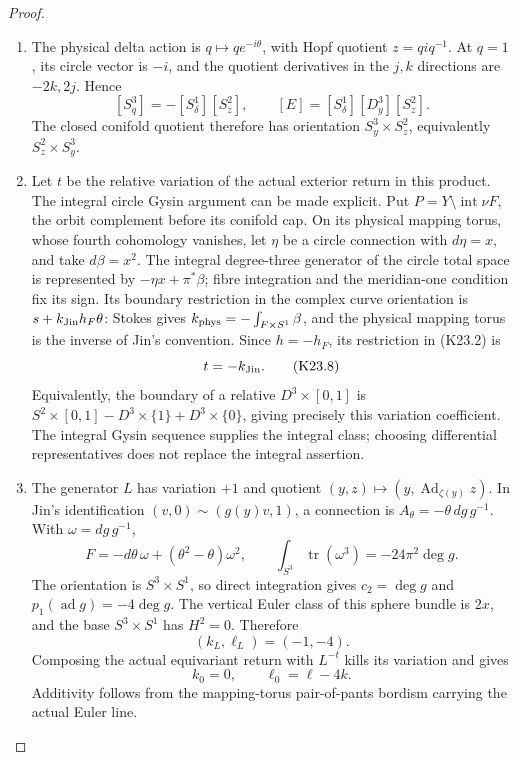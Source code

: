 \begin{proof}
\begin{enumerate}[label=\arabic*.]
\item The physical delta action is \(q\mapsto q e^{-i\theta}\), with
Hopf quotient \(z=q i q^{-1}\). At \(q=1\), its circle vector is
\(-i\), and the quotient derivatives in the \(j,k\) directions are
\(-2k,2j\). Hence
\[
 [S^3_q]=-[S^1_\delta][S^2_z],\qquad
 [E]=[S^1_\delta][D^3_y][S^2_z].                    \tag{K23.7}
\]
The closed conifold quotient therefore has orientation
\(S^3_y\times S^2_z\), equivalently \(S^2_z\times S^3_y\).

\item Let \(t\) be the relative variation of the actual exterior return in
this product. The integral circle Gysin argument can be made
explicit. Put \(P=Y\setminus\operatorname{int}\nu F\), the orbit
complement before its conifold cap. On its physical mapping torus,
whose fourth cohomology vanishes, let \(\eta\)
be a circle connection with \(d\eta=x\), and take
\(d\beta=x^2\). The integral degree-three generator of the circle
total space is represented by
\(-\eta x+\pi^*\beta\); fibre integration and the meridian-one
condition fix its sign. Its boundary restriction in the complex
curve orientation is \(s+k_{\rm Jin}h_F\theta\):
Stokes gives \(k_{\rm phys}=-\int_{F\times S^1}\beta\), and the
physical mapping torus is the inverse of Jin's convention.
Since \(h=-h_F\), its restriction in (K23.2) is
\[
                         t=-k_{\rm Jin}.             \tag{K23.8}
\]
Equivalently, the boundary of a relative \(D^3\times[0,1]\) is
\(S^2\times[0,1]-D^3\times\{1\}+D^3\times\{0\}\), giving precisely
this variation coefficient. The integral Gysin sequence supplies
the integral class; choosing differential representatives does not
replace the integral assertion.

\item The generator \(L\) has variation \(+1\) and quotient
\((y,z)\mapsto(y,\operatorname{Ad}_{\zeta(y)}z)\). In Jin's
identification \((v,0)\sim(g(y)v,1)\), a connection is
\(A_\theta=-\theta\,dg\,g^{-1}\). With \(\omega=dg\,g^{-1}\),
\[
 F=-d\theta\,\omega+(\theta^2-\theta)\omega^2,\qquad
 \int_{S^3}\operatorname{tr}(\omega^3)
                      =-24\pi^2\deg g.
\]
The orientation is \(S^3\times S^1\), so direct integration gives
\(c_2=\deg g\) and \(p_1(\operatorname{ad}g)=-4\deg g\).
The vertical Euler class of this sphere bundle is \(2x\), and
the base \(S^3\times S^1\) has \(H^2=0\). Therefore
\[
                       (k_L,\ell_L)=(-1,-4).
\]
Composing the actual equivariant return with \(L^{-t}\) kills its
variation and gives
\[
                      k_0=0,\qquad \ell_0=\ell-4k.    \tag{K23.9}
\]
Additivity follows from the mapping-torus pair-of-pants bordism
carrying the actual Euler line.


\end{enumerate}
\end{proof}
